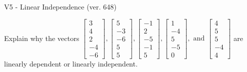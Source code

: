 \begin{exercise}
  \begin{exerciseTitle}V5 - Linear Independence (ver. 648)\end{exerciseTitle}
  \begin{exerciseStatement}
    Explain why the vectors \(\left[\begin{array}{r}
3 \\
4 \\
2 \\
-4 \\
-6
\end{array}\right] , \left[\begin{array}{r}
5 \\
-3 \\
-6 \\
5 \\
5
\end{array}\right] , \left[\begin{array}{r}
-1 \\
2 \\
-5 \\
-1 \\
5
\end{array}\right] , \left[\begin{array}{r}
1 \\
-4 \\
5 \\
-5 \\
0
\end{array}\right] , \text{ and } \left[\begin{array}{r}
4 \\
5 \\
5 \\
-4 \\
4
\end{array}\right]\) are linearly dependent or linearly independent.	



\end{exerciseStatement}
\end{exercise}
